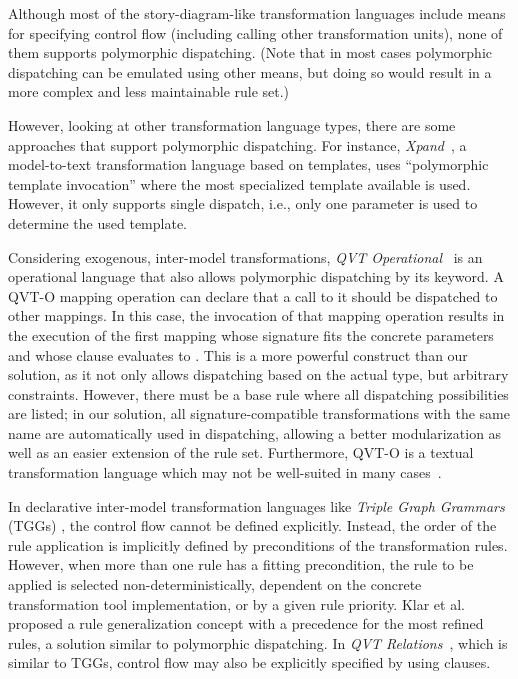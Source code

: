 Although most of the story-diagram-like transformation languages include means for specifying control flow (including calling other transformation units), none of them supports polymorphic dispatching.
(Note that in most cases polymorphic dispatching can be emulated using other means, but doing so would result in a more complex and less maintainable rule set.)

However, looking at other transformation language types, there are some approaches that support polymorphic dispatching. 
For instance, \emph{Xpand}~\cite{xpand}, a model-to-text transformation language based on templates, uses ``polymorphic template invocation'' where the most specialized template available is used.
However, it only supports single dispatch, i.e., only one parameter is used to determine the used template.   

Considering exogenous, inter-model transformations, \emph{QVT Operational}~\cite{QVT} is an operational language that also allows polymorphic dispatching by its  keyword.
A QVT-O mapping operation can declare that a call to it should be dispatched to other mappings.
In this case, the invocation of that mapping operation results in the execution of the first mapping whose signature fits the concrete parameters and whose  clause evaluates to .
This is a more powerful construct than our solution, as it not only allows dispatching based on the actual type, but arbitrary constraints.
However, there must be a base rule where all dispatching possibilities are listed;
in our solution, all signature-compatible transformations with the same name are automatically used in dispatching, allowing a better modularization as well as an easier extension of the rule set.      
Furthermore, QVT-O is a textual transformation language which may not be well-suited in many cases~\cite{Moo09}.

In declarative inter-model transformation languages like \emph{Triple Graph Grammars} (TGGs) \cite{Sch94}, the control flow cannot be defined explicitly.
Instead, the order of the rule application is implicitly defined by preconditions of the transformation rules.
However, when more than one rule has a fitting precondition, the rule to be applied is selected non-deterministically, dependent on the concrete transformation tool implementation, or by a given rule priority.
Klar et al. \cite{Klar07} proposed a rule generalization concept with a precedence for the most refined rules, a solution similar to polymorphic dispatching.
In \emph{QVT Relations}~\cite{QVT}, which is similar to TGGs, control flow may also be explicitly specified by using  clauses.

